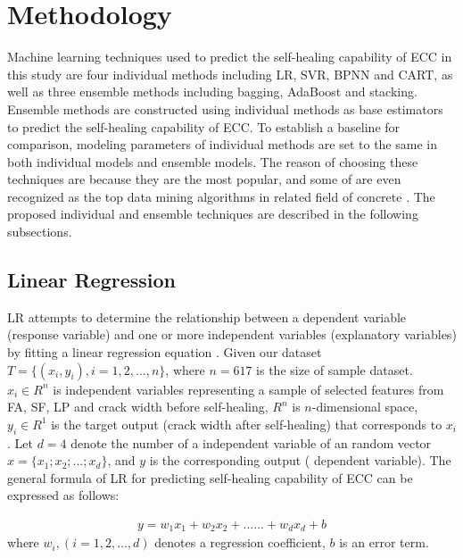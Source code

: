 \documentclass[11pt]{article}
\begin{document}
	
	
	
	\section{Methodology}
	\label{meth}
	
	Machine learning techniques used to predict the self-healing capability of ECC in this study are four individual methods including LR, SVR, BPNN and CART, as well as three ensemble methods including bagging, AdaBoost and stacking. Ensemble methods are constructed using individual methods as base estimators to predict the self-healing capability of ECC. To establish a baseline for comparison, modeling parameters of individual methods are set to the same in both individual models and ensemble models. The reason of choosing these techniques are because they are the most popular, and some of are even recognized as the top data mining algorithms in related field of concrete \cite{chou2014machine}. The proposed individual and ensemble techniques are described in the following subsections. 
	
	
	\subsection{Linear Regression}
	
	LR attempts to determine the relationship between a dependent variable (response variable) and one or more independent variables (explanatory variables) by fitting a linear regression equation \cite{neter1996applied}. Given our dataset $T = \{ (x_i,y_i), i = 1,2,...,n\}$, where $n = 617$ is the size of sample dataset. $x_i \in R^n$ is independent variables representing a sample of selected features from FA, SF, LP and crack width before self-healing, $R^n$ is $n$-dimensional space, $y_i \in R^1$ is the target output (crack width after self-healing) that corresponds to $x_i$. Let $d = 4$ denote the number of a independent variable  of an random vector $x = \{ x_1;x_2;...;x_d \}$, and $y$ is the corresponding output ( dependent variable). The general formula of LR for predicting self-healing capability of ECC can be expressed as follows:
	
	\begin{eqnarray}
	y = w_1 x_1 + w_2 x_2 + ......+ w_d x_d +b                                                      
	\end{eqnarray}
	where $w_i, (i = 1,2,...,d)$ denotes a regression coefficient, $b$ is an error term. 
	
\end{document}

